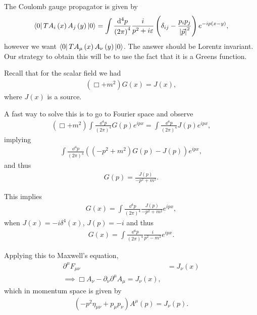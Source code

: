 The Coulomb gauge propagator is given by
\begin{align}
    \bra{0} T A_i \left( x \right) A_j \left( y \right) \ket{0} = \int \frac{\dd{^4p}}{\left( 2\pi\right)^4} \frac{i}{p^2 + i \varepsilon} \left( \delta_{ij} - \frac{p_{i} p_{j}}{\left| \vec{p} \right|^2} \right) e^{-i p \left( x - y  \right) }
,\end{align}
however we want $\bra{0} T A_{\mu}\left( x \right) A_{\nu}\left( y \right) \ket{0}$. The answer should be Lorentz invariant. Our strategy to obtain this will be to use the fact that it is a Greens function.

Recall that for the scalar field we had
\begin{align}
    \left( \Box + m^2  \right) G \left( x \right) = J \left( x \right) 
,\end{align}
where $J\left( x \right) $ is a source.

A fast way to solve this is to go to Fourier space and observe
\begin{align}
    \left( \Box + m^2 \right) \int \frac{\dd{^4p}}{\left( 2\pi\right)^4} G\left( p \right) e^{ipx} = \int \frac{\dd{^4p}}{\left( 2\pi\right)^4} J\left( p \right) e^{ipx}
,\end{align}
implying
\begin{align}
    \int \frac{\dd{^4p}}{\left( 2\pi\right)^4} \left( \left( -p^2 + m^2 \right) G\left( p \right) - J\left( p \right)  \right) e^{ipx}
,\end{align}
and thus
\begin{align}
    G\left( p \right) = \frac{J\left( p \right) }{-p^2 + m^2}
.\end{align}

This implies
\begin{align}
    G\left( x \right) = \int \frac{\dd{^4p}}{\left( 2\pi\right)^4} \frac{J\left( p \right) }{-p^2 + m^2} e^{ipx}
,\end{align}
when $J\left( x \right) = -i \delta^{4}\left( x \right) $, $J\left( p \right)  = -i$ and thus
\begin{align}
    G \left( x \right) = \int \frac{\dd{^4p}}{\left( 2\pi\right)^4} \frac{i}{p^2 - m^2} e^{ipx}
.\end{align}

Applying this to Maxwell's equation,
\begin{align}
    \partial^{\mu} F_{\mu \nu} &= J_\nu\left( x \right)  \\
    \implies \Box A_\nu - \partial_\nu \partial^{\mu} A_\mu = J_\nu \left( x \right) 
,\end{align}
which in momentum space is given by
\begin{align}
    \left( -p^2 \eta_{\mu \nu} + p_\mu p_\nu \right) A^{\mu}\left( p \right) = J_\nu \left( p \right) 
.\end{align}


